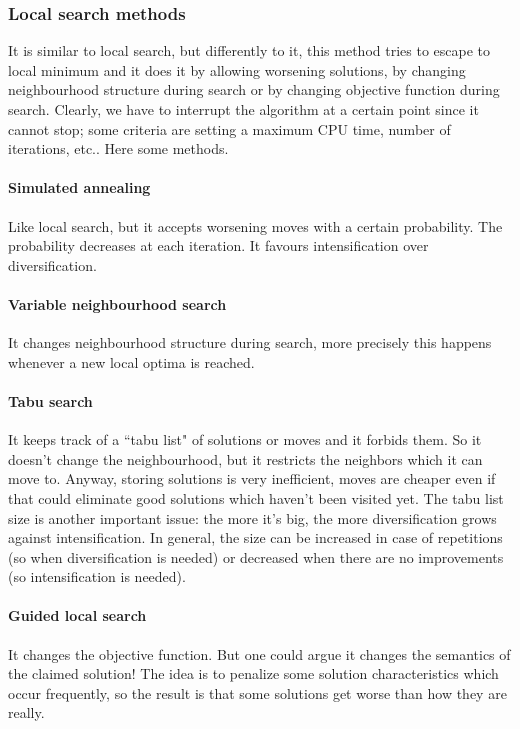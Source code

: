\documentclass[10pt,a4paper]{article}
\begin{document}
\subsubsection{Local search methods}
It is similar to local search, but differently to it, this method tries to
escape to local minimum and it does it by allowing worsening solutions, by
changing neighbourhood structure during search or by changing objective function
during search. Clearly, we have to interrupt the algorithm at a certain point
since it cannot stop; some criteria are setting a maximum CPU time, number of
iterations, etc.. Here some methods.

\paragraph{Simulated annealing}
Like local search, but it accepts worsening moves with a certain probability.
The probability decreases at each iteration. It favours intensification over
diversification.

\paragraph{Variable neighbourhood search}
It changes neighbourhood structure during search, more precisely this happens
whenever a new local optima is reached.

\paragraph{Tabu search}
It keeps track of a ``tabu list" of solutions or moves and it forbids them. So
it doesn't change the neighbourhood, but it restricts the neighbors which it can
move to. Anyway, storing solutions is very inefficient, moves are cheaper even
if that could eliminate good solutions which haven't been visited yet. The tabu
list size is another important issue: the more it's big, the more
diversification grows against intensification. In general, the size can be
increased in case of repetitions (so when diversification is needed) or
decreased when there are no improvements (so intensification is needed).

\paragraph{Guided local search}
It changes the objective function. But one could argue it changes the semantics
of the claimed solution! The idea is to penalize some solution characteristics
which occur frequently, so the result is that some solutions get worse than how
they are really.
\end{document}
